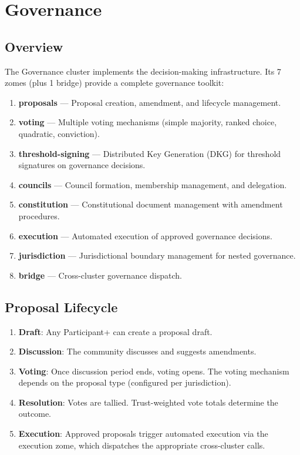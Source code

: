 \documentclass[12pt]{book}
\begin{document}
\chapter{Governance}
\label{ch:governance}

\section{Overview}

The Governance cluster implements the decision-making infrastructure. Its 7
zomes (plus 1 bridge) provide a complete governance toolkit:

\begin{enumerate}
  \item \textbf{proposals} --- Proposal creation, amendment, and lifecycle management.
  \item \textbf{voting} --- Multiple voting mechanisms (simple majority, ranked
    choice, quadratic, conviction).
  \item \textbf{threshold-signing} --- Distributed Key Generation (DKG) for
    threshold signatures on governance decisions.
  \item \textbf{councils} --- Council formation, membership management, and
    delegation.
  \item \textbf{constitution} --- Constitutional document management with
    amendment procedures.
  \item \textbf{execution} --- Automated execution of approved governance
    decisions.
  \item \textbf{jurisdiction} --- Jurisdictional boundary management for
    nested governance.
  \item \textbf{bridge} --- Cross-cluster governance dispatch.
\end{enumerate}

\section{Proposal Lifecycle}

\begin{enumerate}
  \item \textbf{Draft}: Any Participant+ can create a proposal draft.
  \item \textbf{Discussion}: The community discusses and suggests amendments.
  \item \textbf{Voting}: Once discussion period ends, voting opens. The voting
    mechanism depends on the proposal type (configured per jurisdiction).
  \item \textbf{Resolution}: Votes are tallied. Trust-weighted vote
    totals determine the outcome.
  \item \textbf{Execution}: Approved proposals trigger automated execution via
    the execution zome, which dispatches the appropriate cross-cluster calls.
\end{enumerate}
\end{document}
